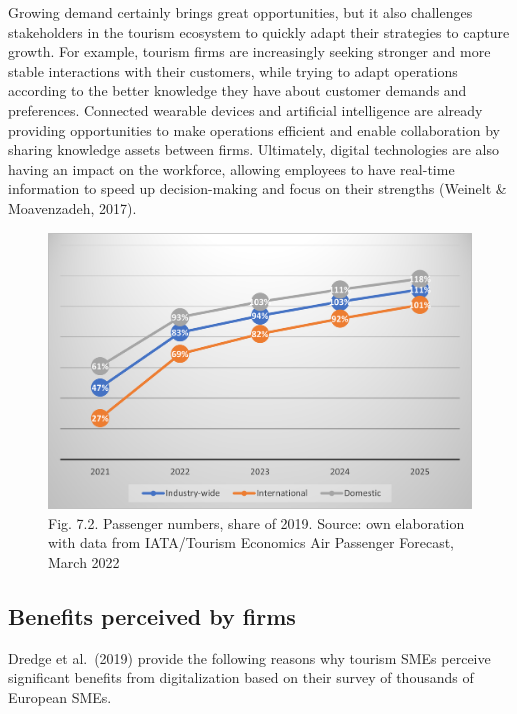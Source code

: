 \documentclass[
  letterpaper,
  DIV=11,
  numbers=noendperiod]{scrreprt}
\begin{document}
Growing demand certainly brings great opportunities, but it also
challenges stakeholders in the tourism ecosystem to quickly adapt their
strategies to capture growth. For example, tourism firms are
increasingly seeking stronger and more stable interactions with their
customers, while trying to adapt operations according to the better
knowledge they have about customer demands and preferences. Connected
wearable devices and artificial intelligence are already providing
opportunities to make operations efficient and enable collaboration by
sharing knowledge assets between firms. Ultimately, digital technologies
are also having an impact on the workforce, allowing employees to have
real-time information to speed up decision-making and focus on their
strengths (Weinelt \& Moavenzadeh, 2017).

\begin{figure}

{\centering \includegraphics{img/fig5.png}

}

\caption{Fig. 7.2. Passenger numbers, share of 2019. Source: own
elaboration with data from IATA/Tourism Economics Air Passenger
Forecast, March 2022}

\end{figure}

\hypertarget{benefits-perceived-by-firms}{%
\subsection{Benefits perceived by
firms}\label{benefits-perceived-by-firms}}

Dredge et al.~(2019) provide the following reasons why tourism SMEs
perceive significant benefits from digitalization based on their survey
of thousands of European SMEs.
\end{document}
